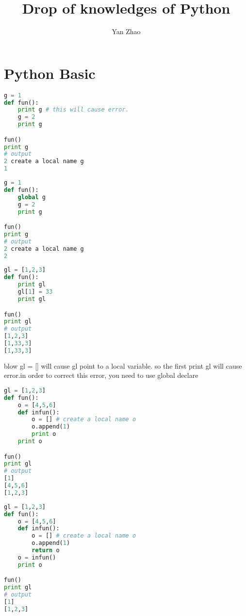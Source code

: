 \documentclass[a4paper,12pt,twoside]{book}
\begin{document}

\title{Drop of knowledges of Python}
\author{Yan Zhao}
\date{}\maketitle


	
\chapter{Python Basic}

\begin{lstlisting}[frame=single, language=Python]
g = 1
def fun():
    print g # this will cause error. 
	g = 2
	print g

fun()
print g
# output 
2 create a local name g
1
\end{lstlisting}  

\begin{lstlisting}[frame=single, language=python]
g = 1
def fun():
	global g
	g = 2
	print g

fun()
print g
# output 
2 create a local name g
2
\end{lstlisting}  

\begin{lstlisting}[frame=single, language=python]
gl = [1,2,3]
def fun():
	print gl
	gl[1] = 33
	print gl

fun()
print gl
# output 
[1,2,3]
[1,33,3]
[1,33,3]
\end{lstlisting}  

blow gl = [] will cause gl point to a local variable. so the first print gl will cause error.in order to correct this error, you need to use global declare

\begin{lstlisting}[frame=single, language=python]
gl = [1,2,3]
def fun():
	o = [4,5,6]
	def infun():
		o = [] # create a local name o
		o.append(1)
		print o
	print o

fun()
print gl
# output 
[1]
[4,5,6]
[1,2,3]
\end{lstlisting}  

\begin{lstlisting}[frame=single, language=python]
gl = [1,2,3]
def fun():
	o = [4,5,6]
	def infun():
		o = [] # create a local name o
		o.append(1)
		return o
	o = infun()
	print o

fun()
print gl
# output 
[1]
[1,2,3]
\end{lstlisting}  
\end{document}
